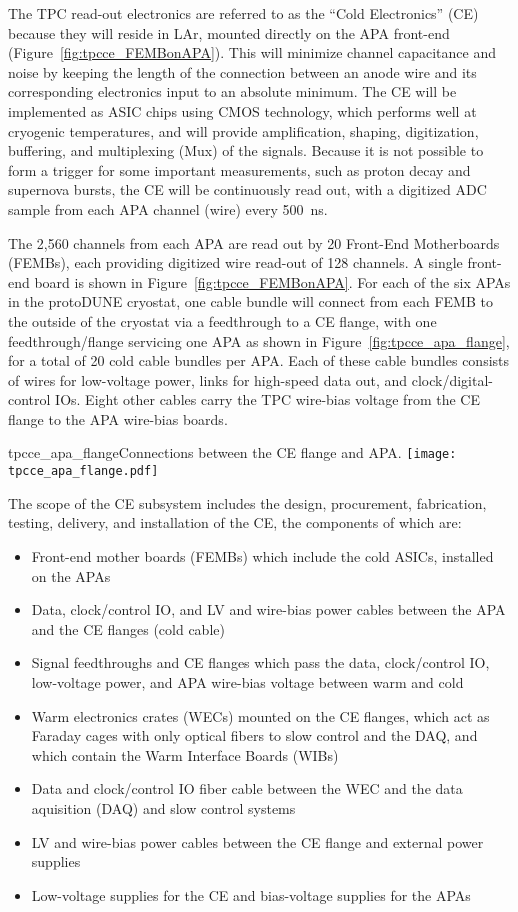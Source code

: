 The TPC read-out electronics are referred to as the ``Cold Electronics'' (CE) because they will reside in LAr,
mounted directly on the APA front-end (Figure~\ref{fig:tpcce_FEMBonAPA}).
This will minimize channel capacitance and noise by keeping the length of the connection between an anode wire
and its corresponding electronics input to an absolute minimum.
The CE will be implemented as ASIC chips using CMOS technology,
which performs well at cryogenic temperatures,
and will provide amplification, shaping, digitization, buffering, and multiplexing (Mux) of the signals.
Because it is not possible to form a trigger for some important measurements,
such as proton decay and supernova bursts, the CE will be continuously read out,
with a digitized ADC sample from each APA channel (wire) every 500~ns.

The 2,560 channels from each APA are read out by 20 Front-End Motherboards (FEMBs), each providing 
digitized wire read-out of 128 channels. A single front-end board is shown in Figure~\ref{fig:tpcce_FEMBonAPA}.
For each of the six APAs in the protoDUNE cryostat, one cable bundle will 
connect from each FEMB to the outside of the cryostat via a feedthrough to a CE flange, with one 
feedthrough/flange servicing one APA as shown in Figure~\ref{fig:tpcce_apa_flange}, for a total 
of 20 cold cable bundles per APA. 
Each of these cable bundles consists of wires for low-voltage power, links for high-speed 
data out, and clock/digital-control IOs. Eight other cables carry the TPC wire-bias voltage 
from the CE flange to the APA wire-bias boards.

\begin{cdrfigure}{tpcce_apa_flange}{Connections between
the CE flange and APA.}
\texttt{[image: tpcce\_apa\_flange.pdf]}
\end{cdrfigure}

The scope of the CE subsystem includes the design, procurement, fabrication, testing,
delivery, and installation of the CE, the components of which are:
\begin{itemize}
\item Front-end mother boards (FEMBs) which include the cold ASICs, installed on the APAs
\item Data, clock/control IO, and LV and wire-bias power cables 
between the APA and the CE flanges (cold cable)
\item Signal feedthroughs and CE flanges which pass the data, clock/control IO, 
low-voltage power, and APA wire-bias voltage between warm and cold
\item Warm electronics crates (WECs) mounted on the CE flanges, which act as Faraday cages with
only optical fibers to slow control and the DAQ, and which contain the Warm Interface Boards (WIBs)
\item Data and clock/control IO fiber cable between the WEC and the data aquisition 
(DAQ) and slow control systems
\item LV and wire-bias power cables between the CE flange and external power supplies
\item Low-voltage supplies for the CE and bias-voltage supplies for the APAs
\end{itemize}

